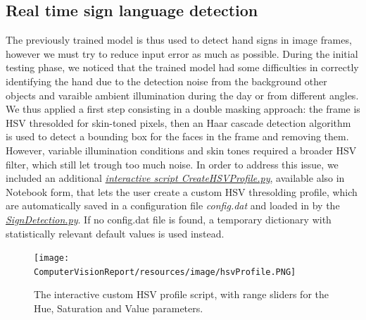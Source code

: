 \documentclass[a4paper, 12pt]{article}
\begin{document}
\subsection{Real time sign language detection}
\label{RTSignDetect}
The previously trained model is thus used to detect hand signs in image frames, however we must try to reduce input error as much as possible.
During the initial testing phase, we noticed that the trained model had some difficulties in correctly identifying the hand due to the detection noise from the background other objects and varaible ambient illumination during the day or from different angles. We thus applied a first step consisting in a double masking approach: the frame is HSV thresolded for skin-toned pixels, then an Haar cascade detection algorithm is used to detect a bounding box for the faces in the frame and removing them.\linebreak
However, variable illumination conditions and skin tones required a broader HSV filter, which still let trough too much noise. In order to address this issue, we included an additional \textit{\hyperref[https://github.com/MarzioVallero/Real-time-Sign-Language-Detection/blob/master/CreateHSVProfile.py]{interactive script CreateHSVProfile.py}}, available also in Notebook form, that lets the user create a custom HSV thresolding profile, which are automatically saved in a configuration file \textit{config.dat} and loaded in by the \textit{\hyperref[https://github.com/MarzioVallero/Real-time-Sign-Language-Detection/blob/master/SignDetection.py]{SignDetection.py}}. If no config.dat file is found, a temporary dictionary with statistically relevant default values is used instead.\linebreak
\begin{figure}[!h]
    \centering
    \texttt{[image: ComputerVisionReport/resources/image/hsvProfile.PNG]} \caption{The interactive custom HSV profile script, with range sliders for the Hue, Saturation and Value parameters.} \label{fig:sign}
\end{figure}
\end{document}
